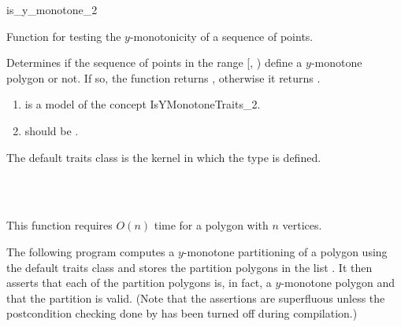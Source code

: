 \begin{ccRefFunction}{is_y_monotone_2}

\ccDefinition

Function for testing the $y$-monotonicity of a sequence of points.


{
Determines if the sequence of points in the range 
[, ) define a $y$-monotone 
polygon or not. If so, the function returns , otherwise it
returns . 
}

\begin{enumerate}
    \item {} is a model of the concept IsYMonotoneTraits\_2.%
    \item {} should be .
\end{enumerate}

The default traits class  is the kernel in which the
type  is defined.%

\ccSeeAlso
{} \\
 \\

\ccImplementation

This function requires $O(n)$ time for a polygon with $n$ vertices.

\ccExample

The following program computes a $y$-monotone partitioning
of a polygon using the default
traits class and stores the partition polygons in the list 
.  It then asserts that each of the partition 
polygons is, in fact, a $y$-monotone polygon and that the partition
is valid.  (Note that the
assertions are superfluous unless the postcondition checking done
by  has been turned off during compilation.)




\end{ccRefFunction}
